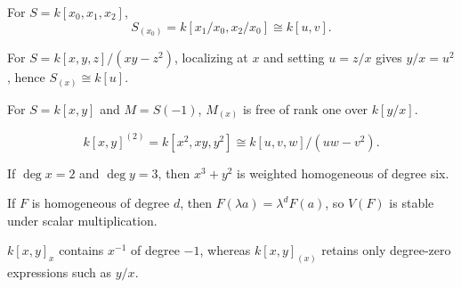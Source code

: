 \begin{example}\label{ex:vi34-10}
For \(S=k[x_0,x_1,x_2]\),
\[
S_{(x_0)}=k[x_1/x_0,x_2/x_0]\cong k[u,v].
\]
\end{example}

\begin{example}\label{ex:vi34-11}
For \(S=k[x,y,z]/(xy-z^2)\), localizing at \(x\) and setting \(u=z/x\) gives \(y/x=u^2\), hence \(S_{(x)}\cong k[u]\).
\end{example}

\begin{example}\label{ex:vi34-12}
For \(S=k[x,y]\) and \(M=S(-1)\), \(M_{(x)}\) is free of rank one over \(k[y/x]\).
\end{example}

\begin{example}\label{ex:vi34-13}
\[
k[x,y]^{(2)}=k[x^2,xy,y^2]\cong k[u,v,w]/(uw-v^2).
\]
\end{example}

\begin{example}\label{ex:vi34-14}
If \(\deg x=2\) and \(\deg y=3\), then \(x^3+y^2\) is weighted homogeneous of degree six.
\end{example}

\begin{example}\label{ex:vi34-15}
If \(F\) is homogeneous of degree \(d\), then \(F(\lambda a)=\lambda^dF(a)\), so \(V(F)\) is stable under scalar multiplication.
\end{example}

\begin{example}\label{ex:vi34-16}
\(k[x,y]_x\) contains \(x^{-1}\) of degree \(-1\), whereas \(k[x,y]_{(x)}\) retains only degree-zero expressions such as \(y/x\).
\end{example}
